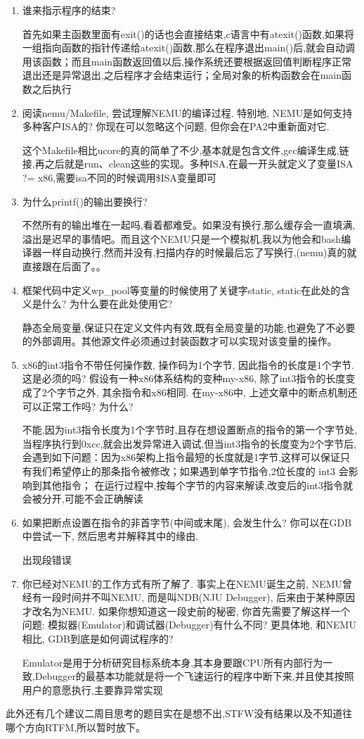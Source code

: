 \documentclass[UTF8,a4paper,10pt]{ctexart}
\begin{document}
{\begin{enumerate}
        是一个opcode\_entry结构体类型的数组,通过RTFSC猜测是模拟指令码的结构体
        \item 谁来指示程序的结束?
        
        首先如果主函数里面有exit()的话也会直接结束,c语言中有atexit()函数,如果将一组指向函数的指针传递给atexit()函数,那么在程序退出main()后,就会自动调用该函数；而且main函数返回值以后,操作系统还要根据返回值判断程序正常退出还是异常退出,之后程序才会结束运行；全局对象的析构函数会在main函数之后执行
        \item 阅读nemu/Makefile, 尝试理解NEMU的编译过程. 特别地, NEMU是如何支持多种客户ISA的? 你现在可以忽略这个问题, 但你会在PA2中重新面对它.
        
        这个Makefile相比ucore的真的简单了不少,基本就是包含文件,gcc编译生成,链接,再之后就是run、clean这些的实现。多种ISA,在最一开头就定义了变量ISA ?= x86,需要isa不同的时候调用\$ISA变量即可
        \item 为什么printf()的输出要换行?
        
        不然所有的输出堆在一起吗,看着都难受。如果没有换行,那么缓存会一直填满,溢出是迟早的事情吧。而且这个NEMU只是一个模拟机,我以为他会和bash编译器一样自动换行,然而并没有,扫描内存的时候最后忘了写换行,(nemu)真的就直接跟在后面了。。
        \item 框架代码中定义wp\_pool等变量的时候使用了关键字static, static在此处的含义是什么? 为什么要在此处使用它?
        
        静态全局变量,保证只在定义文件内有效,既有全局变量的功能,也避免了不必要的外部调用。其他源文件必须通过封装函数才可以实现对该变量的操作。
        \item x86的int3指令不带任何操作数, 操作码为1个字节, 因此指令的长度是1个字节. 这是必须的吗? 假设有一种x86体系结构的变种my-x86, 除了int3指令的长度变成了2个字节之外, 其余指令和x86相同. 在my-x86中, 上述文章中的断点机制还可以正常工作吗? 为什么?
        
        不能,因为int3指令长度为1个字节时,且存在想设置断点的指令的第一个字节处,当程序执行到0xcc,就会出发异常进入调试,但当int3指令的长度变为2个字节后,会遇到如下问题：因为x86架构上指令最短的长度就是1字节,这样可以保证只有我们希望停止的那条指令被修改；如果遇到单字节指令,2位长度的 int3 会影响到其他指令； 在运行过程中,按每个字节的内容来解读,改变后的int3指令就会被分开,可能不会正确解读
        \item 如果把断点设置在指令的非首字节(中间或末尾), 会发生什么? 你可以在GDB中尝试一下, 然后思考并解释其中的缘由.
        
        出现段错误
        \item 你已经对NEMU的工作方式有所了解了. 事实上在NEMU诞生之前, NEMU曾经有一段时间并不叫NEMU, 而是叫NDB(NJU Debugger), 后来由于某种原因才改名为NEMU. 如果你想知道这一段史前的秘密, 你首先需要了解这样一个问题: 模拟器(Emulator)和调试器(Debugger)有什么不同? 更具体地, 和NEMU相比, GDB到底是如何调试程序的?
        
        Emulator是用于分析研究目标系统本身,其本身要跟CPU所有内部行为一致,Debugger的最基本功能就是将一个飞速运行的程序中断下来,并且使其按照用户的意愿执行,主要靠异常实现
    \end{enumerate}

    此外还有几个建议二周目思考的题目实在是想不出,STFW没有结果以及不知道往哪个方向RTFM,所以暂时放下。
}
\end{document}
